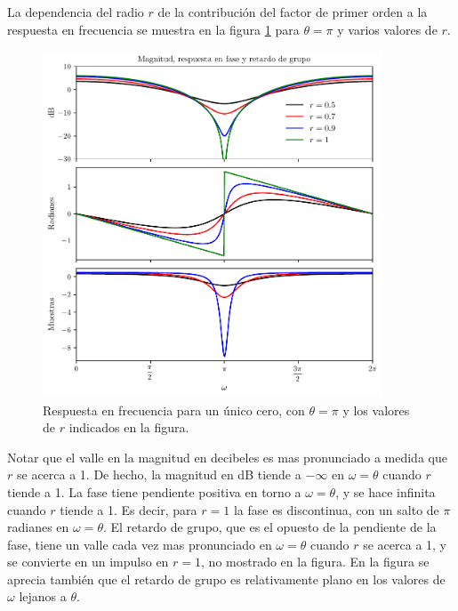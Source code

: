 \documentclass[a4paper]{report}
\begin{document}
La dependencia del radio \(r\) de la contribución del factor de primer orden a la respuesta en frecuencia se muestra en la figura \ref{fig:transform_analysis_first_order_freq_response_r} para \(\theta=\pi\) y varios valores de \(r\).
\begin{figure}[!htb]
 \begin{center}
 \includegraphics[width=0.9\textwidth]{figuras/transform_analysis_first_order_freq_response_r.pdf}
 \caption{\label{fig:transform_analysis_first_order_freq_response_r} Respuesta en frecuencia para un único cero, con \(\theta=\pi\) y los valores de \(r\) indicados en la figura.}
 \end{center}
\end{figure}
Notar que el valle en la magnitud en decibeles es mas pronunciado a medida que \(r\) se acerca a 1. De hecho, la magnitud en dB tiende a \(-\infty\) en \(\omega=\theta\) cuando \(r\) tiende a 1. La fase tiene pendiente positiva en torno a \(\omega=\theta\), y se hace infinita cuando \(r\) tiende a 1. Es decir, para \(r=1\) la fase es discontinua, con un salto de \(\pi\) radianes en \(\omega=\theta\). El retardo de grupo, que es el opuesto de la pendiente de la fase, tiene un valle cada vez mas pronunciado en \(\omega=\theta\) cuando \(r\) se acerca a 1, y se convierte en un impulso en \(r=1\), no mostrado en la figura. En la figura se aprecia también que el retardo de grupo es relativamente plano en los valores de \(\omega\) lejanos a \(\theta\).
\end{document}
